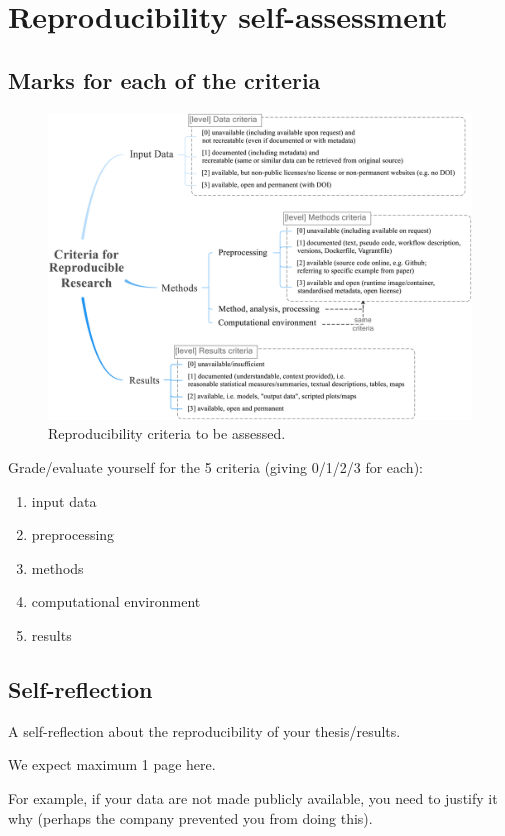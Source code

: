 
\chapter{Reproducibility self-assessment}

\section{Marks for each of the criteria}

\begin{figure}[h]
  \centering
  \includegraphics[width=0.8\linewidth]{figs/reproducibility_criteria.png}
  \caption{Reproducibility criteria to be assessed.}
\label{fig:reproducibility_criteria}
\end{figure}

Grade/evaluate yourself for the 5 criteria (giving 0/1/2/3 for each):
\begin{enumerate}
  \item input data
  \item preprocessing
  \item methods
  \item computational environment
  \item results
\end{enumerate}


\section{Self-reflection} 

A self-reflection about the reproducibility of your thesis/results.

We expect maximum 1 page here.

For example, if your data are not made publicly available, you need to justify it why (perhaps the company prevented you from doing this).